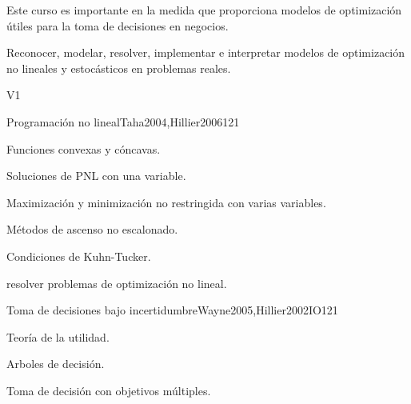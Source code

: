 \begin{syllabus}


\begin{justification}
   Este curso es importante en la medida que proporciona modelos de optimización útiles para la toma de decisiones en negocios.
   \end{justification}
   
   \begin{goals}
   \item Reconocer, modelar, resolver, implementar e interpretar modelos de optimización no lineales y estocásticos en problemas reales.
   \end{goals}
   
   \begin{outcomes}{V1}
      \item {}
      \item {}
      \item {}
      \item {}
      \item {}
   \end{outcomes}
   
   \begin{unit}{Programación no lineal}{}{Taha2004,Hillier2006}{12}{1}
      \begin{topics}
         \item Funciones convexas y cóncavas.
         \item Soluciones de PNL con una variable.
         \item Maximización y minimización no restringida con varias variables.
         \item Métodos de ascenso no escalonado.
         \item Condiciones de Kuhn-Tucker.
      \end{topics}
   
      \begin{learningoutcomes}
         \item resolver problemas de optimización no lineal.
      \end{learningoutcomes}
   \end{unit}
   
   \begin{unit}{Toma de decisiones bajo incertidumbre}{}{Wayne2005,Hillier2002IO}{12}{1}
      \begin{topics}
         \item Teoría de la utilidad.
         \item Arboles de decisión.
         \item Toma de decisión con objetivos múltiples.
      \end{topics}
   

\end{unit}
\end{syllabus}
